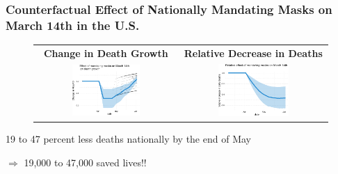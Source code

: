 \documentclass{beamer}
\def\ycolor{\color{red}}
\begin{document}

\begin{frame}
  \frametitle{Counterfactual Effect of Nationally Mandating Masks on  March 14th in the U.S. }


\begin{figure}[ht]
  \begin{minipage}{\linewidth}
    \centering

    \begin{tabular}{cc}
      \textbf{Change in Death Growth} &  \textbf{Relative Decrease in Deaths}\\
      \includegraphics[width=0.5\textwidth]{../tables_and_figures/us-mask-dgrowth_deaths_idx}
      &
        \includegraphics[width=0.5\textwidth]{../tables_and_figures/us-mask-rel_deaths_idx}
    \end{tabular}
  \end{minipage}
\end{figure}

  19 to 47 percent less deaths nationally by the end of May
 
 $\Rightarrow$  {\ycolor 19,000 to 47,000  saved lives!!}

\end{frame}
\end{document}
